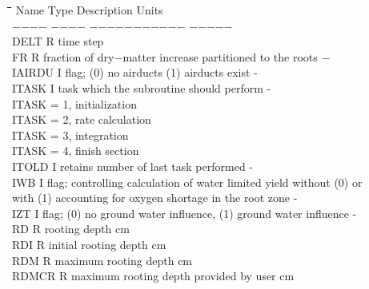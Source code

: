 \begin{tabbing}
\hspace{1.27cm}\=\hspace{1.27cm}\=\hspace{1.27cm}\=\hspace{1.27cm}\=%
\hspace{1.27cm}\=\hspace{1.27cm}\=\hspace{1.27cm}\=\hspace{1.27cm}\=%
\hspace{1.27cm}\=\hspace{1.27cm}\=\kill
Name    \> \> Type   \> Description                                        \> \> \> \> \> \> \> Units\\
$-$$-$$-$$-$    \> \> $-$$-$$-$$-$   \> $-$$-$$-$$-$$-$$-$$-$$-$$-$$-$$-$                                        \> \> \> \> \> \> \> $-$$-$$-$$-$$-$\\
DELT\> \> R\> time step\\
FR      \> \> R   \> fraction of dry$-$matter increase partitioned to the roots      \> \> \> \> \> \> \> $-$\\
IAIRDU\> \> I\> flag; (0) no airducts (1) airducts exist\> \> \> \> \> \> \> -\\
ITASK\> \> I\> task which the subroutine should perform\> \> \> \> \> \> \> -\\
\>\> \> ITASK = 1, initialization\\
\>\> \> ITASK = 2, rate calculation\\
\>\> \> ITASK = 3, integration\\
\>\> \> ITASK = 4, finish section\\
ITOLD\> \> I\> retains number of last task performed\> \> \> \> \> \> \> -\\
IWB\> \> I\> flag; controlling calculation of water limited yield without (0) or \\
\>\> \> with (1) accounting for oxygen shortage in the root zone\> \> \> \> \> \> \> -\\
IZT\> \> I\> flag; (0) no ground water influence, (1) ground water influence\> \> \> \> \> \> \> -\\
RD\> \> R\> rooting depth\> \> \> \> \> \> \> cm\\
RDI\> \> R\> initial rooting depth\> \> \> \> \> \> \> cm\\
RDM\> \> R\> maximum rooting depth\> \> \> \> \> \> \> cm\\
RDMCR\> \> R\> maximum rooting depth provided by user\> \> \> \> \> \> \> cm\\

\end{tabbing}
